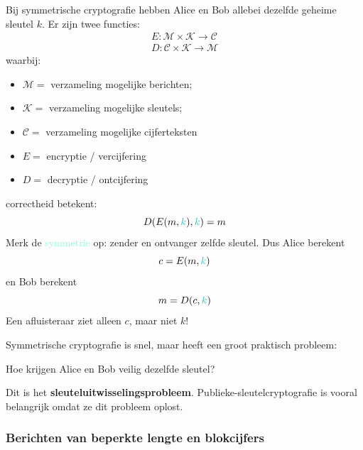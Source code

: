 Bij symmetrische cryptografie hebben Alice en Bob allebei dezelfde geheime sleutel $k$. Er zijn twee functies:
\begin{equation*}
    \begin{gathered}
        E : \mathcal{M} \times \mathcal{K} \to \mathcal{C} \\
        D : \mathcal{C} \times \mathcal{K} \to \mathcal{M}
    \end{gathered}
\end{equation*}
waarbij:
\begin{itemize}
    \item $\mathcal{M} =$ verzameling mogelijke berichten;
    \item $\mathcal{K} =$ verzameling mogelijke sleutels;
    \item $\mathcal{C} =$ verzameling mogelijke cijferteksten
    \item $E =$ encryptie / vercijfering
    \item $D =$ decryptie / ontcijfering
\end{itemize}
correctheid betekent:
\begin{equation*}
    D(E(m, \textcolor{Aquamarine}{k}), \textcolor{Aquamarine}{k}) = m
\end{equation*}
Merk de \textcolor{Aquamarine}{symmetrie} op: zender en ontvanger zelfde sleutel. Dus Alice berekent
\begin{equation*}
    c = E(m, \textcolor{Aquamarine}{k})
\end{equation*}
en Bob berekent
\begin{equation*}
    m = D(c, \textcolor{Aquamarine}{k})
\end{equation*}
Een afluisteraar ziet alleen $c$, maar niet $k$!


Symmetrische cryptografie is snel, maar heeft een groot praktisch probleem:
\begin{barbox}[RoyalPurple!75][gray!3]
    Hoe krijgen Alice en Bob veilig dezelfde sleutel?
\end{barbox}
Dit is het \textbf{sleuteluitwisselingsprobleem}. Publieke-sleutelcryptografie is vooral belangrijk omdat ze dit probleem oplost.

\subsubsection{Berichten van beperkte lengte en blokcijfers}

